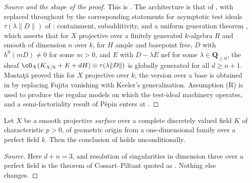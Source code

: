 \begin{proof}[Source and the shape of the proof]
This is \cite[Theorem~8.2]{GJKM19}.  The architecture is that of
, with
 replaced throughout by the
corresponding statements for asymptotic test ideals
\(\tau(\lambda\|D\|)\) of : containment,
subadditivity, and a uniform generation theorem
\cite[Theorem~1.3 and Theorem~4.6]{GJKM19}, which asserts that for
\(X\) projective over a finitely generated \(k\)-algebra \(R\) and smooth of
dimension \(n\) over \(k\), for \(H\) ample and basepoint free, \(D\) with
\(h^0(mD)\neq0\) for some \(m>0\), and \(E\) with \(D-\lambda E\) nef for
some \(\lambda\in\mathbf Q_{\geq0}\), the sheaf
\(\cO_X(K_{X/k}+E+dH)\otimes\tau(\lambda\|D\|)\) is globally generated for
all \(d\geq n+1\).  Mustaţă proved this for \(X\) projective over \(k\);
the version over a base is obtained in \cite[Theorem~4.6]{GJKM19} by
replacing Fujita vanishing with Keeler's generalization.  Assumption
\textup{(R)} is used to produce the regular models on which the test-ideal
machinery operates, and a semi-factoriality result of P\'epin enters at
\cite[Lemma~7.5]{GJKM19}.
\end{proof}

\begin{corollary}
\label{cor:ch23-gjkm-surfaces}
Let \(X\) be a smooth projective \emph{surface} over a complete discretely
valued field \(K\) of characteristic \(p>0\), of geometric origin from a
one-dimensional family over a perfect field \(k\).  Then the conclusion of
 holds unconditionally.
\end{corollary}

\begin{proof}[Source]
Here \(d+n=3\), and resolution of singularities in dimension three over a
perfect field is the theorem of Cossart--Piltant quoted as
\cite[Theorem~6.3]{GJKM19}.  Nothing else changes.
\end{proof}

